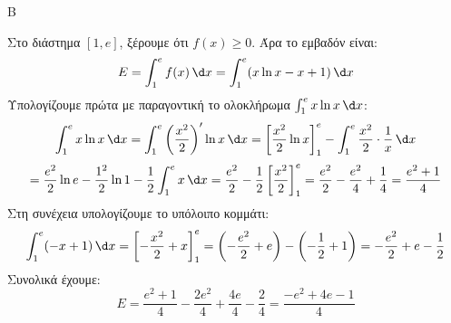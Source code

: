 \begin{thema}{Β}
\begin{erwthma}
\item Στο διάστημα $[1, e]$, ξέρουμε ότι $f(x) \ge 0$. Άρα το εμβαδόν είναι:
\[ E = \int_1^e f(x)\,\d x = \int_1^e (x \ln x - x + 1)\,\d x \]
Υπολογίζουμε πρώτα με παραγοντική το ολοκλήρωμα $\int_1^e x \ln x\,\d x$:
\[ \int_1^e x \ln x\,\d x = \int_1^e \left(\frac{x^2}{2}\right)' \ln x\,\d x = \left[ \frac{x^2}{2} \ln x \right]_1^e - \int_1^e \frac{x^2}{2} \cdot \frac{1}{x}\,\d x \]
\[ = \frac{e^2}{2} \ln e - \frac{1^2}{2} \ln 1 - \frac{1}{2}\int_1^e x\,\d x = \frac{e^2}{2} - \frac{1}{2} \left[ \frac{x^2}{2} \right]_1^e = \frac{e^2}{2} - \frac{e^2}{4} + \frac{1}{4} = \frac{e^2+1}{4} \]
Στη συνέχεια υπολογίζουμε το υπόλοιπο κομμάτι:
\[ \int_1^e (-x+1)\,\d x = \left[ -\frac{x^2}{2} + x \right]_1^e = \left(-\frac{e^2}{2} + e\right) - \left(-\frac{1}{2} + 1\right) = -\frac{e^2}{2} + e - \frac{1}{2} \]
Συνολικά έχουμε:
\[ E = \frac{e^2+1}{4} - \frac{2e^2}{4} + \frac{4e}{4} - \frac{2}{4} = \frac{-e^2 + 4e - 1}{4} \]
\end{erwthma}
\end{thema}

